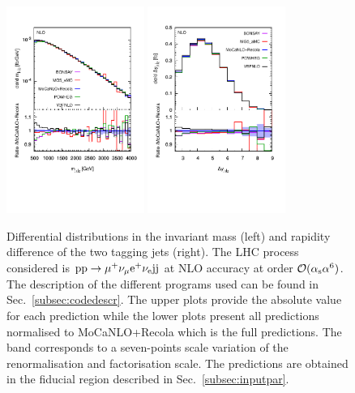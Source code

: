 \documentclass[twocolumn,epjc3]{svjour3} %
\newlength{\width}
\begin{document}
     \begin{figure}[hbt!]
       \centering
       \includegraphics[width=0.4\textwidth,angle=0,clip=true,trim={0.4cm 2cm 0.cm 1.cm}]{figures/NLO/mjj_NLO.pdf}
       \includegraphics[width=0.4\textwidth,angle=0,clip=true,trim={0.4cm 2cm 0.cm 1.cm}]{figures/NLO/dyj1j2_NLO.pdf}
    \caption{\label{fig:distNLO1} Differential distributions in the invariant mass (left) and rapidity difference of the two tagging jets (right).
    The LHC process considered is ${\rm p}{\rm p}\to\mu^+\nu_\mu{\rm e}^+\nu_{\rm e}{\rm j}{\rm j}$ at NLO accuracy at order $\mathcal{O}(\alpha_{\rm s}\alpha^6)$.
    The description of the different programs used can be found in Sec.~\protect\ref{subsec:codedescr}.
    The upper plots provide the absolute value for each prediction while the lower plots present all predictions normalised to {\sc MoCaNLO}+{\sc Recola} which is the full predictions.
    The band corresponds to a seven-points scale variation of the renormalisation and factorisation scale.
    The predictions are obtained in the fiducial region described in Sec.~\protect\ref{subsec:inputpar}.
    }
    \end{figure}
\end{document}
